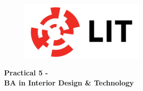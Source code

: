 

\newpage
\setcounter{page}{1}
\begin{center}
	\begin{figure}[ht]
		\centering
		\includegraphics[width = 6cm]{img/LITlogo.jpg}
		\label{fig:logoa5}
	\end{figure}
	\Large\textbf{Practical 5 - }\\
	\large\textbf{BA in Interior Design \& Technology}
\end{center}		

